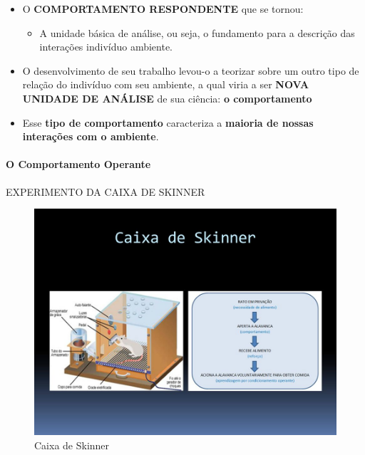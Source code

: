 \documentclass[
]{book}
\providecommand{\tightlist}{%
  \setlength{\itemsep}{0pt}\setlength{\parskip}{0pt}}
\begin{document}
\begin{itemize}
  \begin{itemize}
  \tightlist
  \item
    O \textbf{COMPORTAMENTO RESPONDENTE} que se tornou:

    \begin{itemize}
    \tightlist
    \item
      A unidade básica de análise, ou seja, o fundamento para a
      descrição das interações indivíduo ambiente.
    \end{itemize}
  \item
    O desenvolvimento de seu trabalho levou-o a teorizar sobre um outro
    tipo de relação do indivíduo com seu ambiente, a qual viria a ser
    \textbf{NOVA UNIDADE DE ANÁLISE} de sua ciência: \textbf{o
    comportamento}
  \item
    Esse \textbf{tipo de comportamento} caracteriza a \textbf{maioria de
    nossas interações com o ambiente}.
  \end{itemize}
\end{itemize}

\hypertarget{o-comportamento-operante}{%
\paragraph{O Comportamento Operante}\label{o-comportamento-operante}}

EXPERIMENTO DA CAIXA DE SKINNER

\begin{figure}

{\centering \includegraphics[width=0.9\linewidth]{imagens/p1-caixa-de-skinner} 

}

\caption{Caixa de Skinner}\label{fig:unnamed-chunk-4}
\end{figure}
\end{document}

